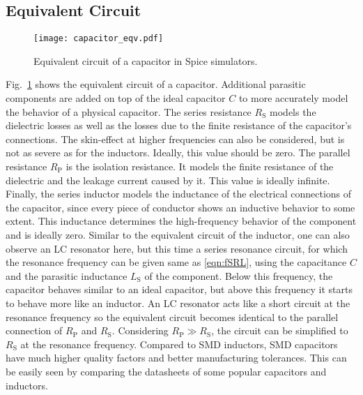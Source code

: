 \subsection{Equivalent Circuit}
\begin{figure}[ptb]
	\centering
	\texttt{[image: capacitor\_eqv.pdf]}
	\caption{Equivalent circuit of a capacitor in Spice simulators.}
	\label{fig:cap_eqv}
\end{figure}
Fig.~\ref{fig:cap_eqv} shows the equivalent circuit of a capacitor. Additional parasitic components are added on top of the ideal capacitor $C$ to more accurately model the behavior of a physical capacitor. The series resistance $R_\mathrm{S}$ models the dielectric losses as well as the losses due to the finite resistance of the capacitor's connections. The skin-effect at higher frequencies can also be considered, but is not as severe as for the inductors. Ideally, this value should be zero. The parallel resistance $R_\mathrm{P}$ is the isolation resistance. It models the finite resistance of the dielectric and the leakage current caused by it. This value is ideally infinite. Finally, the series inductor models the inductance of the electrical connections of the capacitor, since every piece of conductor shows an inductive behavior to some extent. This inductance determines the high-frequency behavior of the component and is ideally zero. Similar to the equivalent circuit of the inductor, one can also observe an LC resonator here, but this time a series resonance circuit, for which the resonance frequency can be given same as \eqref{eqn:fSRL}, using the capacitance $C$ and the parasitic inductance $L_\mathrm{S}$ of the component. Below this frequency, the capacitor behaves similar to an ideal capacitor, but above this frequency it starts to behave more like an inductor. An LC resonator acts like a short circuit at the resonance frequency so the equivalent circuit becomes identical to the parallel connection of $R_{\mathrm{P}}$ and $R_{\mathrm{S}}$. Considering $R_{\mathrm{P}} \gg R_{\mathrm{S}}$, the circuit can be simplified to $R_{\mathrm{S}}$ at the resonance frequency. Compared to SMD inductors, SMD capacitors have much higher quality factors and better manufacturing tolerances. This can be easily seen by comparing the datasheets of some popular capacitors and inductors.

